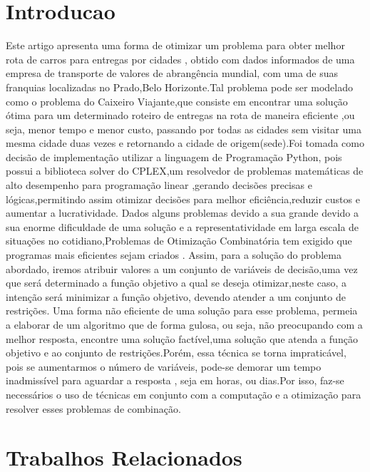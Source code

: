 \documentclass[12pt]{article}
\begin{document}
\section{Introducao}

Este artigo apresenta uma forma de otimizar um problema para obter melhor rota de carros para entregas por cidades , obtido com dados informados de uma empresa de transporte de valores de abrangência mundial, com uma de suas franquias localizadas no Prado,Belo Horizonte.Tal problema pode ser modelado como o problema do Caixeiro Viajante,que consiste em encontrar uma solução ótima para um determinado roteiro de entregas na rota de maneira eficiente ,ou seja, menor tempo e menor custo, passando por todas as cidades sem visitar uma mesma cidade duas vezes e retornando a cidade de origem(sede).Foi tomada como decisão de implementação utilizar a linguagem de Programação Python, pois possui a biblioteca solver do CPLEX,um resolvedor de problemas matemáticas de alto desempenho para programação linear ,gerando decisões precisas e lógicas,permitindo assim otimizar decisões para melhor eficiência,reduzir custos e aumentar a lucratividade.
Dados alguns problemas devido a sua grande devido a sua enorme dificuldade de uma solução e a representatividade em larga escala de situações no cotidiano,Problemas de Otimização Combinatória tem exigido que programas mais eficientes sejam criados .
Assim, para a solução do problema abordado, iremos atribuir valores a um conjunto de variáveis de decisão,uma vez que será determinado a função objetivo a qual se deseja otimizar,neste caso, a intenção será minimizar a função objetivo, devendo atender a um conjunto de restrições.
Uma forma não eficiente de uma solução para esse problema, permeia a  elaborar de um algoritmo que de forma gulosa, ou seja, não preocupando com a melhor resposta, encontre uma solução factível,uma solução que atenda a função objetivo e ao conjunto de restrições.Porém, essa técnica se torna impraticável, pois se aumentarmos o número de variáveis, pode-se demorar um tempo inadmissível para aguardar a resposta , seja em horas, ou dias.Por isso, faz-se necessários o uso de técnicas em conjunto com a computação e a otimização para resolver esses problemas de combinação.



\section{Trabalhos Relacionados}
\end{document}
